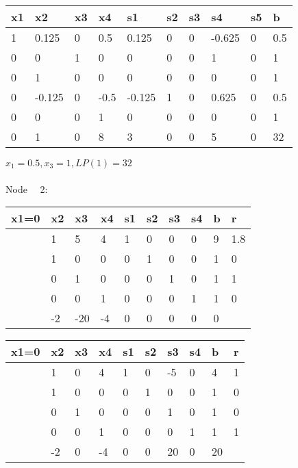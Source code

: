 \documentclass{article} %
\numberwithin{equation}{section} %
\numberwithin{figure}{section} %
\numberwithin{table}{section} %
\begin{document}
\begin{center}
\begin{tabular}{|l|l|l|l|l|l|l|l|l|l|}
\hline
x1 & x2     & x3 & x4   & s1     & s2 & s3 & s4     & s5 & b   \\ \hline
1  & 0.125  & 0  & 0.5  & 0.125  & 0  & 0  & -0.625 & 0  & 0.5 \\ \hline
0  & 0      & 1  & 0    & 0      & 0  & 0  & 1      & 0  & 1   \\ \hline
0  & 1      & 0  & 0    & 0      & 0  & 0  & 0      & 0  & 1   \\ \hline
0  & -0.125 & 0  & -0.5 & -0.125 & 1  & 0  & 0.625  & 0  & 0.5 \\ \hline
0  & 0      & 0  & 1    & 0      & 0  & 0  & 0      & 0  & 1   \\ \hline
0  & 1      & 0  & 8    & 3      & 0  & 0  & 5      & 0  & 32  \\ \hline
\end{tabular}
\end{center}
$x_1=0.5,x_3=1,LP(1)=32$
\\
\\
Node \ \ 2:
\begin{center}
\begin{tabular}{|l|l|l|l|l|l|l|l|l|l|}
\hline
x1=0 & x2 & x3  & x4 & s1 & s2 & s3 & s4 & b & r   \\ \hline
     & 1  & 5   & 4  & 1  & 0  & 0  & 0  & 9 & 1.8 \\ \hline
     & 1  & 0   & 0  & 0  & 1  & 0  & 0  & 1 & 0   \\ \hline
     & 0  & 1   & 0  & 0  & 0  & 1  & 0  & 1 & 1   \\ \hline
     & 0  & 0   & 1  & 0  & 0  & 0  & 1  & 1 & 0   \\ \hline
     & -2 & -20 & -4 & 0  & 0  & 0  & 0  & 0 &     \\ \hline
\end{tabular}
\end{center}
\begin{center}
\begin{tabular}{|l|l|l|l|l|l|l|l|l|l|}
\hline
x1=0 & x2 & x3 & x4 & s1 & s2 & s3 & s4 & b  & r \\ \hline
     & 1  & 0  & 4  & 1  & 0  & -5 & 0  & 4  & 1 \\ \hline
     & 1  & 0  & 0  & 0  & 1  & 0  & 0  & 1  & 0 \\ \hline
     & 0  & 1  & 0  & 0  & 0  & 1  & 0  & 1  & 0 \\ \hline
     & 0  & 0  & 1  & 0  & 0  & 0  & 1  & 1  & 1 \\ \hline
     & -2 & 0  & -4 & 0  & 0  & 20 & 0  & 20 &   \\ \hline
\end{tabular}
\end{center}
\end{document}
